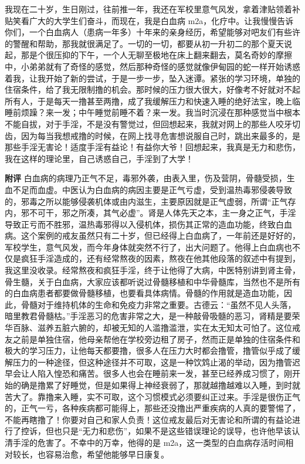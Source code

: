 \begin{case}
    我现在二十岁，生日刚过，往前推一年，我还在军校里意气风发，拿着津贴领着补贴笑看广大的大学生们奋斗，而现在，我是白血病 m2a，化疗中。让我慢慢告诉你们，一个白血病人（患病一年多）十年来的亲身经历，希望能够对吧友们有些许的警醒和帮助，那我就很满足了。一切的一切，都要从初一升初二的那个夏天说起，那是个很压抑的下午，一个人无聊至极地在床上翻来翻去，莫名奇妙的摩擦中，小弟弟就有了奇怪的感觉，然后那种奇怪的感觉就像伊甸园的蛇一样开始诱惑着我，让我开始了新的尝试，于是一步一步，坠入迷谭。紧张的学习环境，单独的住宿条件，给了我无限制撸的机会。那时候的压力很大很大，好像考不好就对不起所有人，于是每天一撸甚至两撸，成了我缓解压力和快速入睡的绝好法宝，晚上临睡前烦躁？来一发；中午睡觉前睡不着？来一发。我当时沉浸在那种感觉当中根本不能自拔，对于手淫，不是没有警觉过，但回想起来，我就对网上的那些人咬牙切齿，因为每当我想戒撸的时候，在网上找寻危害想说服自己时，跳出来最多的，是那些手淫无害论！适度手淫有益论！有益你大爷！回想起来，我真是无力和悲伤，我在这样的理论里，自己诱惑自己，手淫到了大学！

    \textbf{附评} 白血病的病理乃正气不足，毒邪外袭，由表入里，伤及营阴，骨髓受损，生血不足而血虚。中医认为白血病的病因主要是正气亏虚，受到温热毒邪侵袭导致的，邪毒之所以能够侵袭机体或由内滋生，主要原因就是正气虚弱，所谓“正气存内，邪不可干，邪之所凑，其气必虚”。肾是人体先天之本，主一身之正气，手淫导致正亏而不胜邪，温热毒邪得以入侵机体，损伤其正常的造血功能，终致白血病。这个案例的戒友虽然只有二十岁，但已经得上白血病了，一年前还是好好的，军校学生，意气风发，而今年身体就突然不行了，出大问题了。他得上白血病也不仅是疯狂手淫造成的，还有经常熬夜的因素，熬夜在他其他段落的叙述中有提到，我这里没收录。经常熬夜和疯狂手淫，终于让他得了大病，中医特别讲到肾主骨，骨生髓，关于白血病，大家应该都听说过骨髓移植和中华骨髓库，当然也不是所有的白血病患者都要做骨髓移植，也要看具体病情。骨髓的作用就是造血功能，因此，骨髓对于维持机体的生命和免疫力非常之重要。古德云：“虽然不见人头落，暗里教君骨髓枯。”手淫恶习的危害非常之大，是一种敲骨吸髓的恶习，肾精是要荣华百脉、滋养五脏六腑的，却被无知的人滥撸滥泄，实在太无知太可怕了。这位戒友之前是单独住宿，他母亲帮他在学校旁边租了房子，然而正是单独的住宿条件和极大的学习压力，让他每天都要撸，很多人在压力大时都会撸管，撸管似乎成了缓解压力的一种途径，但这种途径并不可取，这是一种饮鸩止渴的举动，因为撸管迟早会让人陷入惶恐和痛苦。很多人也会在睡前来一发，甚至已经养成习惯了，刚开始的确是撸累了好睡觉，但是如果得上神经衰弱了，那就越撸越难以入睡，到时就苦大了。靠撸来入睡，实不可取，这个习惯模式必须要纠正过来。手淫是很伤正气的，正气一亏，各种疾病都可能得上，那些还没撸出严重疾病的人真的要警惕了，不能再瞎撸了！你要对自己和家人负责！这位戒友最后对无害论和所谓的有益论进行了控诉，但也只是“无力和悲伤”，如果不是这些错误理论的误导，也许他早该认清手淫的危害了。不幸中的万幸，他得的是 m2a，这一类型的白血病存活时间相对较长，也容易治愈，希望他能够早日康复。
\end{case}

